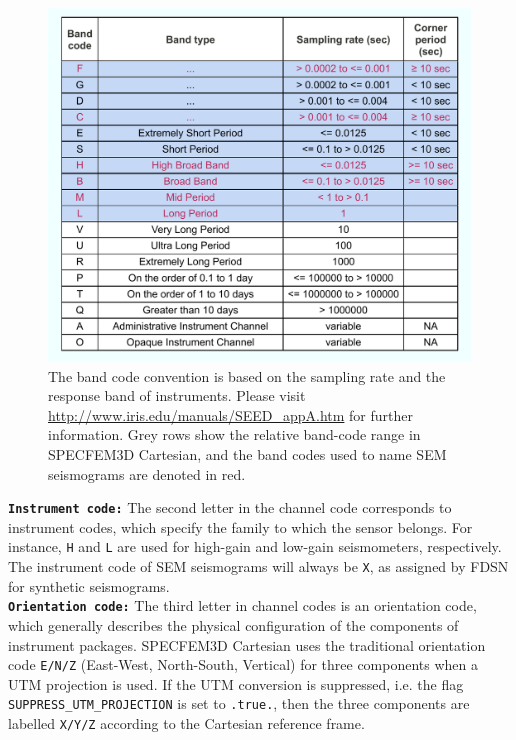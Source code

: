 \begin{figure}[ht]
\noindent \begin{centering}
\includegraphics[scale=0.6]{figures/IRIS_band_codes.pdf}
\par\end{centering}

\caption{The band code convention is based on the sampling rate and the response
band of instruments. Please visit \url{http://www.iris.edu/manuals/SEED_appA.htm}
for further information. Grey rows show the relative band-code range
in SPECFEM3D Cartesian, and the band codes used to name SEM seismograms
are denoted in red.}


\label{fig:IRIS_band_codes}
\end{figure}


\noindent \texttt{\textbf{Instrument code:}} The second letter in
the channel code corresponds to instrument codes, which specify the
family to which the sensor belongs. For instance, \texttt{H} and \texttt{L}
are used for high-gain and low-gain seismometers, respectively. The
instrument code of SEM seismograms will always be \texttt{X}, as assigned
by FDSN for synthetic seismograms. \\


\noindent \texttt{\textbf{Orientation code:}} The third letter in
channel codes is an orientation code, which generally describes the
physical configuration of the components of instrument packages. SPECFEM3D
Cartesian uses the traditional orientation code \texttt{E/N/Z} (East-West,
North-South, Vertical) for three components when a UTM projection
is used. If the UTM conversion is suppressed, i.e. the flag \texttt{SUPPRESS\_UTM\_PROJECTION}
is set to \texttt{.true.}, then the three components are labelled
\texttt{X/Y/Z} according to the Cartesian reference frame. \\



